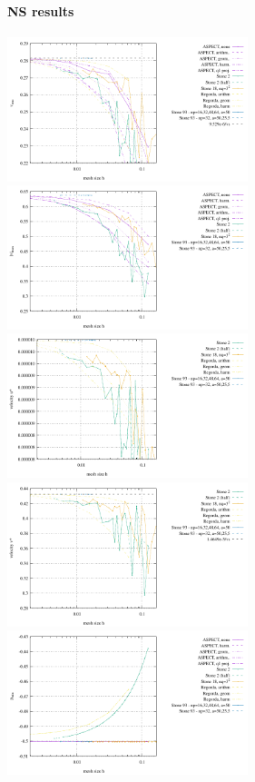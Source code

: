 \newpage
\paragraph{NS results}

\begin{center}
\includegraphics[width=7cm]{images/stokes_sphere2D/vrms_NS}
\includegraphics[width=7cm]{images/stokes_sphere2D/max_vel_NS}\\
\includegraphics[width=7cm]{images/stokes_sphere2D/max_u_NS}
\includegraphics[width=7cm]{images/stokes_sphere2D/max_v_NS}\\
\includegraphics[width=7cm]{images/stokes_sphere2D/pressure_min_NS}

\end{center}
